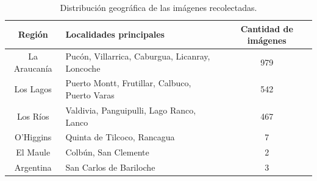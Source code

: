 \documentclass[runningheads]{llncs}
\begin{document}
\begin{table}[H]
\centering
\caption{Distribución geográfica de las imágenes recolectadas.}
\label{tab:distribucion_imagenes}

\begin{tabular}{|c|>{\centering\arraybackslash}p{7cm}|c|}
\hline
\rowcolor{gray!20}
\textbf{Región} & \textbf{Localidades principales} & \textbf{Cantidad de imágenes} \\
\hline
La Araucanía & Pucón, Villarrica, Caburgua, Licanray, Loncoche & 979 \\
\hline
Los Lagos & Puerto Montt, Frutillar, Calbuco, Puerto Varas & 542 \\
\hline
Los Ríos & Valdivia, Panguipulli, Lago Ranco, Lanco & 467 \\
\hline
O'Higgins & Quinta de Tilcoco, Rancagua & 7 \\
\hline
El Maule & Colbún, San Clemente & 2 \\
\hline
Argentina & San Carlos de Bariloche & 3 \\
\hline
\end{tabular}

\end{table}
\end{document}
